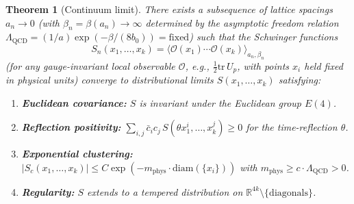 \documentclass[11pt]{article}
\newtheorem{theorem}{Theorem}[section]
\theoremstyle{definition}
\newcommand{\tr}{\mathrm{tr}}
\newcommand{\R}{\mathbb{R}}
\newcommand{\Lam}{\Lambda_{\mathrm{QCD}}}
\begin{document}
\begin{theorem}[Continuum limit]\label{thm:continuum}
There exists a subsequence of lattice spacings $a_n\to 0$ (with
$\beta_n=\beta(a_n)\to\infty$ determined by the asymptotic freedom
relation $\Lam=(1/a)\exp(-\beta/(8b_0))=\mathrm{fixed}$) such that
the Schwinger functions
\[
S_n(x_1,\ldots,x_k)=\langle\mathcal{O}(x_1)\cdots\mathcal{O}(x_k)
\rangle_{a_n,\beta_n}
\]
(for any gauge-invariant local observable $\mathcal{O}$, e.g.,
$\frac{1}{2}\tr\,U_p$, with points $x_i$ held fixed in physical
units) converge to distributional limits $S(x_1,\ldots,x_k)$
satisfying:
\begin{enumerate}[nosep,label=(\roman*)]
\item \textbf{Euclidean covariance:} $S$ is invariant under the
Euclidean group $E(4)$.
\item \textbf{Reflection positivity:}
$\sum_{i,j}\bar c_i c_j\,S(\theta x_1^i,\ldots,x_k^j)\ge 0$
for the time-reflection $\theta$.
\item \textbf{Exponential clustering:}
$|S_c(x_1,\ldots,x_k)|\le C\exp(-m_{\mathrm{phys}}\cdot
\mathrm{diam}(\{x_i\}))$ with $m_{\mathrm{phys}}\ge c\cdot\Lam>0$.
\item \textbf{Regularity:} $S$ extends to a tempered distribution
on $\R^{4k}\setminus\{\text{diagonals}\}$.
\end{enumerate}
\end{theorem}
\end{document}
